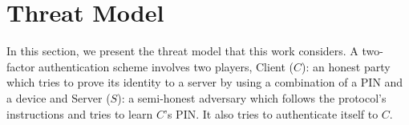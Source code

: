 


 
\vspace{-4mm}
\section{Threat Model}\label{sec::model}
 \vspace{-2mm}

In this section, we present the threat model that this work considers. A two-factor authentication scheme involves two players,
%
%
%
%
 {Client ($C$)}: an honest party which tries to prove its identity to a server by using a combination of a PIN and a device and {Server ($S$)}:  a semi-honest adversary which follows the protocol's instructions and tries to learn $C$'s PIN. It also tries to authenticate itself to $C$.  


